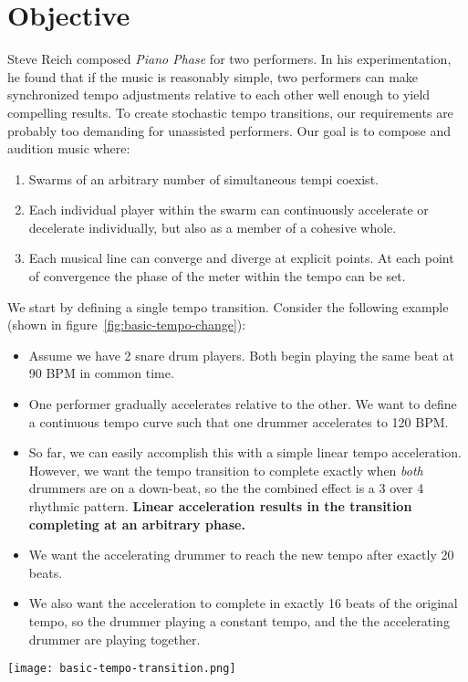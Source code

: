 \section{Objective}
\label{sec:polytempic-objective}
Steve Reich composed \textit{Piano Phase} for two performers. In his
experimentation, he found that if the music is reasonably simple, two
performers can make synchronized tempo adjustments relative to each
other well enough to yield compelling results. To create stochastic
tempo transitions, our requirements are probably too demanding for
unassisted performers. Our goal is to compose and audition music
where:
\begin{enumerate}
  \item Swarms of an arbitrary number of simultaneous tempi
    coexist. 
  \item Each individual player within the swarm can continuously
    accelerate or decelerate individually, but also as a member of a
    cohesive whole. 
  \item Each musical line can converge and diverge at explicit
    points. At each point of convergence the phase of the meter within
    the tempo can be set.
\end{enumerate}
We start by defining a single tempo transition. Consider the following
example (shown in figure~\ref{fig:basic-tempo-change}):
\begin{itemize}
\item Assume we have 2 snare drum players. Both begin playing the same
  beat at 90 BPM in common time.
\item One performer gradually accelerates relative to the other. We want
  to define a continuous tempo curve such that one drummer accelerates
  to 120 BPM.
\item So far, we can easily accomplish this with a simple linear tempo
  acceleration. However, we want the tempo transition to complete
  exactly when \emph{both} drummers are on a down-beat, so the the
  combined effect is a 3 over 4 rhythmic pattern. \textbf{Linear
    acceleration results in the transition completing at an arbitrary
    phase.}
\item We want the accelerating drummer to reach the new tempo after
  exactly 20 beats.
\item We also want the acceleration to complete in exactly 16 beats of
  the original tempo, so the drummer playing a constant tempo, and the
  the accelerating drummer are playing together.
\end{itemize}
\begin{figure*}[h]
  \texttt{[image: basic-tempo-transition.png]}
  \caption[Tempo Transition]{Tempo Transition from 90~BPM
    to 120~BPM}
  \label{fig:basic-tempo-change}
\end{figure*}


